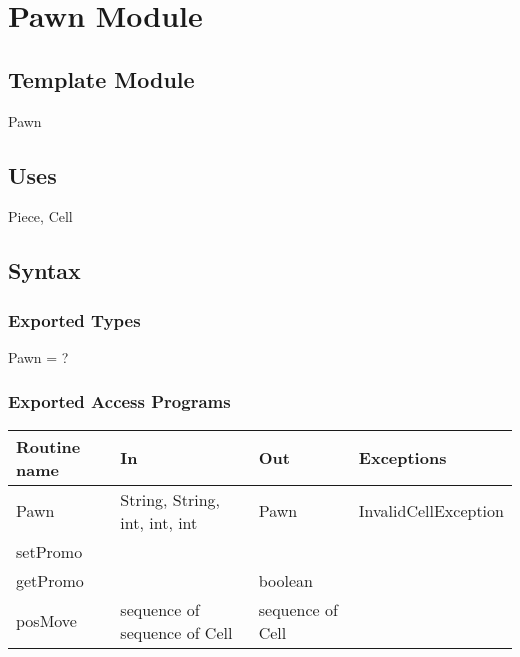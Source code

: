\documentclass[12pt]{article}
\begin{document}
\newpage































\section* {Pawn Module}

\subsection*{Template Module}

Pawn

\subsection* {Uses}

Piece, Cell

\subsection* {Syntax}

\subsubsection* {Exported Types}

Pawn = ?

\subsubsection* {Exported Access Programs}

\begin{tabular}{| l | l | l | l |}
\hline
\textbf{Routine name} & \textbf{In} & \textbf{Out} & \textbf{Exceptions}\\
\hline
Pawn &String, String, int, int, int & Pawn & InvalidCellException\\
\hline
setPromo & ~ & ~ & ~\\
\hline
getPromo & ~ & boolean & ~ \\
\hline
posMove & sequence of sequence of Cell & sequence of Cell & ~\\
\hline
\end{tabular}
\end{document}
